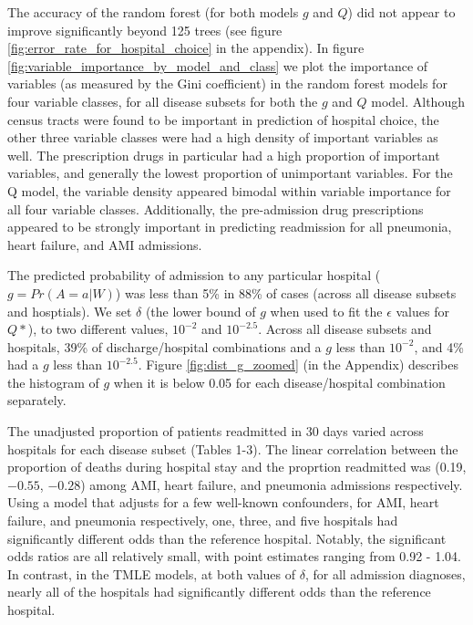 \documentclass[]{article}\usepackage[]{graphicx}\usepackage[]{color}
\begin{document}
The accuracy of the random forest (for both models $g$ and $Q$) did not appear to improve significantly beyond 125 trees (see figure \ref{fig:error_rate_for_hospital_choice} in the appendix). In figure \ref{fig:variable_importance_by_model_and_class} we plot the importance of variables (as measured by the Gini coefficient) in the random forest models for four variable classes, for all disease subsets for both the $g$ and $Q$ model. Although census tracts were found to be important in prediction of hospital choice,  the other three variable classes were had a high density of important variables as well. The prescription drugs in particular had a high proportion of important variables, and generally the lowest proportion of unimportant variables. For the Q model, the variable density appeared bimodal within variable importance for all four variable classes. Additionally, the pre-admission drug prescriptions appeared to be strongly important in predicting readmission for all pneumonia, heart failure, and AMI admissions.

The predicted probability of admission to any particular hospital ($g=Pr(A=a|W)$) was less than 5\% in 88\% of cases (across all disease subsets and hosptials).  We set $\delta$ (the lower bound of $g$ when used to fit the $\epsilon$ values for $Q*$), to two different values, $10^{-2}$ and $10^{-2.5}$. Across all disease subsets and hospitals, 39\% of discharge/hospital combinations and a $g$ less than $10^{-2}$, and 4\% had a $g$ less than $10^{-2.5}$. Figure \ref{fig:dist_g_zoomed} (in the Appendix) describes the histogram of $g$ when it is below 0.05 for each disease/hospital combination separately. 

The unadjusted proportion of patients readmitted in 30 days varied across hospitals for each disease subset (Tables 1-3). The linear correlation between the proportion of deaths during hospital stay and the proprtion readmitted was (0.19, \ensuremath{-0.55}, \ensuremath{-0.28}) among AMI, heart failure, and pneumonia admissions respectively. Using a model that adjusts for a few well-known confounders, for AMI, heart failure, and pneumonia respectively, one, three, and five hospitals had significantly different odds than the reference hospital. Notably, the significant odds ratios are all relatively small, with point estimates ranging from 0.92 - 1.04. In contrast, in the TMLE models, at both values of $\delta$, for all admission diagnoses, nearly all of the hospitals had significantly different odds than the reference hospital.
\end{document}
